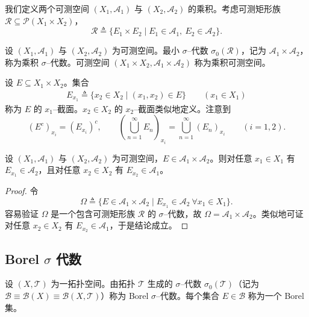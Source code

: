 \documentclass[../../main.tex]{subfiles}%
\begin{document}
我们定义两个可测空间 $(X_1,\mathcal{A}_1)$ 与 $(X_2,\mathcal{A}_2)$ 的乘积。考虑可测矩形族 $\mathcal{R}\subseteq\mathcal{P}(X_1\times X_2)$，
\[
\mathcal{R}\triangleq \{E_1\times E_2\mid E_1\in\mathcal{A}_1,\ E_2\in\mathcal{A}_2\}.
\]

\begin{definition}\label{definition:ch01-乘积sigma代数}
\label{subsection:ch01-乘积}
设 $(X_1,\mathcal{A}_1)$ 与 $(X_2,\mathcal{A}_2)$ 为可测空间。最小 $\sigma$--代数 $\sigma_0(\mathcal{R})$，记为 $\mathcal{A}_1\times\mathcal{A}_2$，称为乘积 $\sigma$--代数。可测空间 $(X_1\times X_2,\mathcal{A}_1\times\mathcal{A}_2)$ 称为乘积可测空间。
\end{definition}

设 $E\subseteq X_1\times X_2$。集合
\begin{align}
E_{x_1}\triangleq \{x_2\in X_2\mid(x_1,x_2)\in E\}\qquad(x_1\in X_1) \label{align:ch01-截面}
\end{align}
称为 $E$ 的 $x_1$--截面。$x_2\in X_2$ 的 $x_2$--截面类似地定义。注意到
\[
(E^c)_{x_i}=(E_{x_i})^c,\qquad
\left(\bigcup_{n=1}^\infty E_n\right)_{x_i}=\bigcup_{n=1}^\infty(E_n)_{x_i}\qquad(i=1,2).
\]

\begin{proposition}\label{proposition:ch01-截面可测}\label{proposition:ch01-截口}\label{proposition:ch01-截面}
设 $(X_1,\mathcal{A}_1)$ 与 $(X_2,\mathcal{A}_2)$ 为可测空间，$E\in\mathcal{A}_1\times\mathcal{A}_2$。则对任意 $x_1\in X_1$ 有 $E_{x_1}\in\mathcal{A}_2$，且对任意 $x_2\in X_2$ 有 $E_{x_2}\in\mathcal{A}_1$。
\end{proposition}

\begin{proof}
令
\[
\Omega\triangleq \{E\in\mathcal{A}_1\times\mathcal{A}_2\mid E_{x_1}\in\mathcal{A}_2\ \forall x_1\in X_1\}.
\]
容易验证 $\Omega$ 是一个包含可测矩形族 $\mathcal{R}$ 的 $\sigma$--代数，故 $\Omega=\mathcal{A}_1\times\mathcal{A}_2$。类似地可证对任意 $x_2\in X_2$ 有 $E_{x_2}\in\mathcal{A}_1$，于是结论成立。
\end{proof}

\subsection{Borel $\sigma$ 代数}\label{subsection:ch01-Borel代数}

\begin{definition}\label{definition:ch01-Borel代数}
设 $(X,\mathcal{T})$ 为一拓扑空间。由拓扑 $\mathcal{T}$ 生成的 $\sigma$--代数 $\sigma_0(\mathcal{T})$（记为 $\mathcal{B}\equiv\mathcal{B}(X)\equiv\mathcal{B}(X,\mathcal{T})$）称为 Borel $\sigma$--代数。每个集合 $E\in\mathcal{B}$ 称为一个 Borel 集。
\end{definition}
\end{document}
